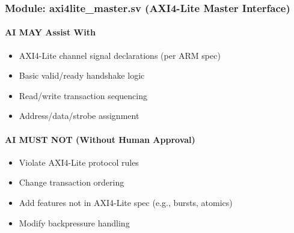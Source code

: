 \subsubsection{\texorpdfstring{Module: axi4lite\_\allowbreak{}master.sv
(AXI4-Lite Master
Interface)}{Module: axi4lite\_master.sv (AXI4-Lite Master Interface)}}\label{cr:status:phase1-ai-human-responsibilities:module-axi4lite-mastersv-axi4-lite-master-interface}

\paragraph{\texorpdfstring{\ok{} AI MAY Assist
With}{ AI MAY Assist With}}\label{cr:status:phase1-ai-human-responsibilities:white-check-mark-ai-may-assist-with-6}

\begin{record}

\begin{itemize}
\tightlist
\item
  AXI4-Lite channel signal declarations (per ARM spec)
\item
  Basic valid/\allowbreak{}ready handshake logic
\item
  Read/\allowbreak{}write transaction sequencing
\item
  Address/\allowbreak{}data/\allowbreak{}strobe assignment
\end{itemize}

\end{record}

\paragraph{\texorpdfstring{\warn{} AI MUST NOT (Without Human
Approval)}{ AI MUST NOT (Without Human Approval)}}\label{cr:status:phase1-ai-human-responsibilities:warning-ai-must-not-without-human-approval-6}

\begin{record}

\begin{itemize}
\tightlist
\item
  Violate AXI4-Lite protocol rules
\item
  Change transaction ordering
\item
  Add features not in AXI4-Lite spec (e.g., bursts, atomics)
\item
  Modify backpressure handling
\end{itemize}

\end{record}

